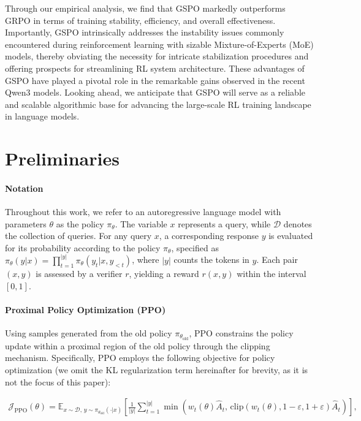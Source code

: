 Through our empirical analysis, we find that GSPO markedly outperforms GRPO in terms of training stability, efficiency, and overall effectiveness. Importantly, GSPO intrinsically addresses the instability issues commonly encountered during reinforcement learning with sizable Mixture-of-Experts (MoE) models, thereby obviating the necessity for intricate stabilization procedures and offering prospects for streamlining RL system architecture. These advantages of GSPO have played a pivotal role in the remarkable gains observed in the recent Qwen3 models. Looking ahead, we anticipate that GSPO will serve as a reliable and scalable algorithmic base for advancing the large-scale RL training landscape in language models.

\section{Preliminaries}

\paragraph{Notation}
Throughout this work, we refer to an autoregressive language model with parameters $\theta$ as the policy $\pi_\theta$. The variable $x$ represents a query, while $\mathcal{D}$ denotes the collection of queries. For any query $x$, a corresponding response $y$ is evaluated for its probability according to the policy $\pi_\theta$, specified as $\pi_\theta (y | x)=\prod_{t=1}^{|y|} \pi_\theta (y_t | x, y_{<t} )$, where $|y|$ counts the tokens in $y$. Each pair $(x, y)$ is assessed by a verifier $r$, yielding a reward $r(x, y)$ within the interval $[0, 1]$.

\paragraph{Proximal Policy Optimization (PPO)} Using samples generated from the old policy $\pi_{\theta_\text{old}}$, PPO \citep{ppo} constrains the policy update within a proximal region of the old policy through the clipping mechanism. Specifically, PPO employs the following objective for policy optimization (we omit the KL regularization term hereinafter for brevity, as it is not the focus of this paper):

\begin{align}
\mathcal{J}_\text{PPO}(\theta) = \mathbb{E}_{ x \sim \mathcal{D},\, y \sim \pi_{\theta_\text{old}}( \cdot | x) }
\left[ \frac{1}{|y|} \sum_{t=1}^{|y|} 
\min \left( w_{t}(\theta) \widehat{A}_{t},  \, \mathrm{clip} \left( w_{t}(\theta), 1 - {\varepsilon}, 1 + {\varepsilon}\right) \widehat{A}_{t} \right)
\right],
\end{align}

